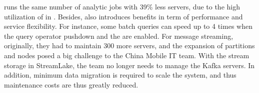  \sys runs the same number of analytic jobs with 39\% less servers, due to the high utilization of  in \sys. Besides, \sys also introduces  benefits in term of performance and service flexibility. For instance, some batch queries can speed up to 4 times when the query operator pushdown and the \brain are enabled. 
 For message streaming, originally, they had to maintain 300 more \kafka servers, and the expansion of partitions and nodes posed a big challenge to the China Mobile IT team. With the stream storage in StreamLake, the team no longer needs to  manage the Kafka servers. In addition, minimum data migration is required to scale the system, and thus maintenance costs are thus greatly reduced. 
 
 
  


























